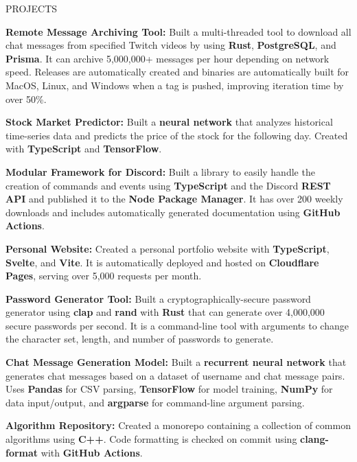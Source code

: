 \documentclass{resume}
\begin{document}
\begin{rSection}{PROJECTS}
	\vspace{-1.25em}

	\item \textbf{Remote Message Archiving Tool:} {Built a multi-threaded tool to download all chat messages from specified Twitch videos by using \textbf{Rust}, \textbf{PostgreSQL}, and \textbf{Prisma}. It can archive 5,000,000+ messages per hour depending on network speed. Releases are automatically created and binaries are automatically built for MacOS, Linux, and Windows when a tag is pushed, improving iteration time by over 50\%.}

	\item \textbf{Stock Market Predictor:} {Built a \textbf{neural network} that analyzes historical time-series data and predicts the price of the stock for the following day. Created with \textbf{TypeScript} and \textbf{TensorFlow}.}

	\item \textbf{Modular Framework for Discord:} {Built a library to easily handle the creation of commands and events using \textbf{TypeScript} and the Discord \textbf{REST API} and published it to the \textbf{Node Package Manager}. It has over 200 weekly downloads and includes automatically generated documentation using \textbf{GitHub Actions}.}

	\item \textbf{Personal Website:} {Created a personal portfolio website with \textbf{TypeScript}, \textbf{Svelte}, and \textbf{Vite}. It is automatically deployed and hosted on \textbf{Cloudflare Pages}, serving over 5,000 requests per month.}

	\item \textbf{Password Generator Tool:} {Built a cryptographically-secure password generator using \textbf{clap} and \textbf{rand} with \textbf{Rust} that can generate over 4,000,000 secure passwords per second. It is a command-line tool with arguments to change the character set, length, and number of passwords to generate.}

	\item \textbf{Chat Message Generation Model:} {Built a \textbf{recurrent neural network} that generates chat messages based on a dataset of username and chat message pairs. Uses \textbf{Pandas} for CSV parsing, \textbf{TensorFlow} for model training, \textbf{NumPy} for data input/output, and \textbf{argparse} for command-line argument parsing.}

	\item \textbf{Algorithm Repository:} {Created a monorepo containing a collection of common algorithms using \textbf{C++}. Code formatting is checked on commit using \textbf{clang-format} with \textbf{GitHub Actions}.}

\end{rSection}
\end{document}
